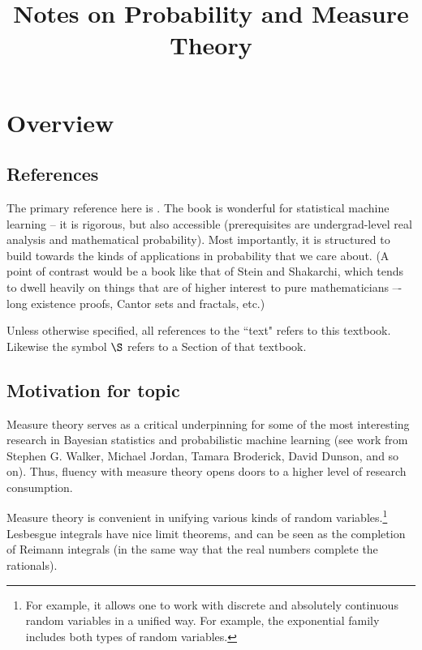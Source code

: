 \documentclass{article} %
\begin{document}
\title{Notes on Probability and Measure Theory} 
\maketitle
\setcounter{tocdepth}{2}
\tableofcontents
\newpage 

\section{Overview}

\subsection{References}
The primary reference here is \cite{ash2000probability}.   The book is wonderful for statistical machine learning – it is rigorous,  but also accessible (prerequisites are undergrad-level real analysis and mathematical probability).  Most importantly, it is structured to build towards the kinds of applications in probability that we care about.   (A point of contrast would be a book like that of Stein and Shakarchi, which tends to dwell heavily on things that are of higher interest to pure mathematicians –- long existence proofs, Cantor sets and fractals, etc.) 

 Unless otherwise specified, all references to the ``text" refers to this textbook.  Likewise the symbol $\S$ refers to a Section of that textbook.
 
\subsection{Motivation for topic} \label{sec:motivation_for_topic}

Measure theory serves as a critical underpinning for some of the most interesting research in Bayesian statistics and probabilistic machine learning (see work from Stephen G. Walker, Michael Jordan, Tamara Broderick, David Dunson, and so on).   Thus, fluency with measure theory opens doors to a higher level of research consumption. 
  
Measure theory is convenient in unifying various kinds of random variables.\footnote{For example, it allows one to work with discrete and absolutely continuous random variables in a unified way.  For example, the exponential family includes both types of random variables.}  Lesbesgue integrals have nice limit theorems, and can be seen as the completion of Reimann integrals (in the same way that the real numbers complete the rationals). 
\end{document}
